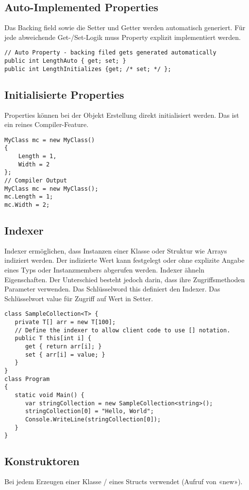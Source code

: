 \subsection{Auto-Implemented Properties}
Das Backing field sowie die Setter und Getter werden automatisch generiert. Für jede abweichende Get-/Set-Logik muss Property explizit implementiert werden.
\begin{lstlisting}
// Auto Property - backing filed gets generated automatically
public int LengthAuto { get; set; }
public int LengthInitializes {get; /* set; */ };
\end{lstlisting}

\subsection{Initialisierte Properties}
Properties können bei der Objekt Erstellung direkt initialisiert werden. Das ist ein reines Compiler-Feature.
\begin{lstlisting}
MyClass mc = new MyClass()
{
	Length = 1, 
	Width = 2
};
// Compiler Output
MyClass mc = new MyClass();
mc.Length = 1;
mc.Width = 2;
\end{lstlisting}

\subsection{Indexer}
Indexer ermöglichen, dass Instanzen einer Klasse oder Struktur wie Arrays indiziert werden. Der indizierte Wert kann festgelegt oder ohne explizite Angabe eines Typs oder Instanzmembers abgerufen werden. Indexer ähneln Eigenschaften. Der Unterschied besteht jedoch darin, dass ihre Zugriffsmethoden Parameter verwenden. Das Schlüsselword this definiert den Indexer. Das Schlüsselwort value für Zugriff auf Wert in Setter.
\begin{lstlisting}
class SampleCollection<T> {
   private T[] arr = new T[100];
   // Define the indexer to allow client code to use [] notation.
   public T this[int i] {
      get { return arr[i]; }
      set { arr[i] = value; }
   }
}
class Program
{
   static void Main() {
      var stringCollection = new SampleCollection<string>();
      stringCollection[0] = "Hello, World";
      Console.WriteLine(stringCollection[0]);
   }
}
\end{lstlisting}

\subsection{Konstruktoren}
Bei jedem Erzeugen einer Klasse / eines Structs verwendet (Aufruf von «new»).

